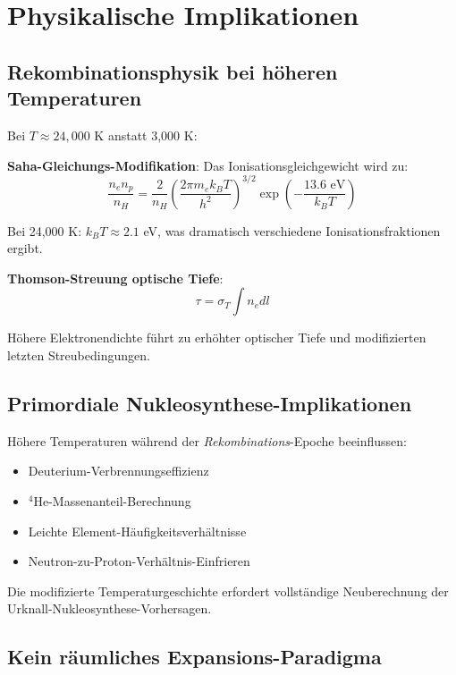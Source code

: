 \documentclass[12pt,a4paper]{article}
\begin{document}
	\section{Physikalische Implikationen}
	\label{sec:physikalische_implikationen}
	
	\subsection{Rekombinationsphysik bei höheren Temperaturen}
	\label{subsec:rekombinationsphysik}
	
	Bei $T \approx 24{,}000$ K anstatt 3,000 K:
	
	\textbf{Saha-Gleichungs-Modifikation}: Das Ionisationsgleichgewicht wird zu:
	\begin{equation}
		\frac{n_e n_p}{n_H} = \frac{2}{n_H}\left(\frac{2\pi m_e k_B T}{h^2}\right)^{3/2} \exp\left(-\frac{13.6 \text{ eV}}{k_B T}\right)
	\end{equation}
	
	Bei 24,000 K: $k_B T \approx 2.1$ eV, was dramatisch verschiedene Ionisationsfraktionen ergibt.
	
	\textbf{Thomson-Streuung optische Tiefe}:
	\begin{equation}
		\tau = \sigma_T \int n_e dl
	\end{equation}
	
	Höhere Elektronendichte führt zu erhöhter optischer Tiefe und modifizierten letzten Streubedingungen.
	
	\subsection{Primordiale Nukleosynthese-Implikationen}
	\label{subsec:nukleosynthese}
	
	Höhere Temperaturen während der \textit{Rekombinations}-Epoche beeinflussen:
	\begin{itemize}
		\item Deuterium-Verbrennungseffizienz
		\item $^4$He-Massenanteil-Berechnung
		\item Leichte Element-Häufigkeitsverhältnisse
		\item Neutron-zu-Proton-Verhältnis-Einfrieren
	\end{itemize}
	
	Die modifizierte Temperaturgeschichte erfordert vollständige Neuberechnung der Urknall-Nukleosynthese-Vorhersagen.
	
	\subsection{Kein räumliches Expansions-Paradigma}
	\label{subsec:keine_expansion}
	
\end{document}
